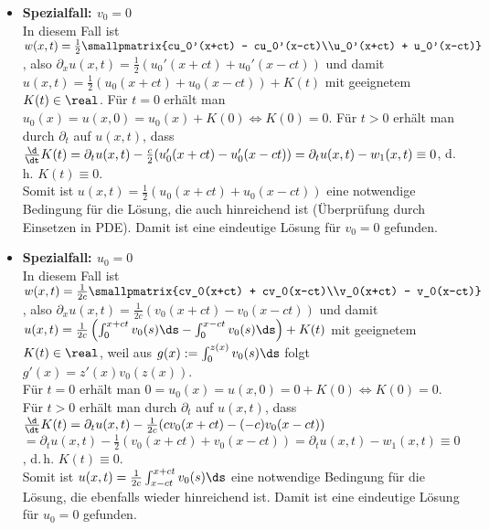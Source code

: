 \linie

\begin{Bem}
    \begin{itemize}
        \item
        \textbf{Spezialfall: $v_0 = 0$}\\
        In diesem Fall ist
        $w(x, t) = \frac{1}{2} \smallpmatrix{cu_0'(x+ct) - cu_0'(x-ct)\\u_0'(x+ct) + u_0'(x-ct)}$,
        also $\partial_x u(x, t) = \frac{1}{2} (u_0'(x+ct) + u_0'(x-ct))$ und damit
        $u(x, t) = \frac{1}{2} (u_0(x+ct) + u_0(x-ct)) + K(t)$ mit geeignetem $K(t) \in \real$.
        Für $t = 0$ erhält man $u_0(x) = u(x, 0) = u_0(x) + K(0) \iff K(0) = 0$.
        Für $t > 0$ erhält man durch $\partial_t$ auf $u(x, t)$, dass
        $\frac{\d}{\dt} K(t) = \partial_t u(x, t) - \frac{c}{2} (u_0'(x+ct) - u_0'(x-ct))
        = \partial_t u(x, t) - w_1(x, t) \equiv 0$,
        d.\,h. $K(t) \equiv 0$.\\
        Somit ist $u(x, t) = \frac{1}{2} (u_0(x+ct) + u_0(x-ct))$ eine notwendige Bedingung
        für die Lösung, die auch hinreichend ist (Überprüfung durch Einsetzen in PDE).
        Damit ist eine eindeutige Lösung für $v_0 = 0$ gefunden.

        \item
        \textbf{Spezialfall: $u_0 = 0$}\\
        In diesem Fall ist
        $w(x, t) = \frac{1}{2c} \smallpmatrix{cv_0(x+ct) + cv_0(x-ct)\\v_0(x+ct) - v_0(x-ct)}$,
        also $\partial_x u(x, t) = \frac{1}{2c} (v_0(x+ct) - v_0(x-ct))$ und damit
        $u(x, t) = \frac{1}{2c} \left(\int_0^{x+ct} v_0(s) \ds - \int_0^{x-ct} v_0(s) \ds\right)
        + K(t)$ mit geeignetem $K(t) \in \real$,
        weil aus $g(x) := \int_0^{z(x)} v_0(s) \ds$ folgt $g'(x) = z'(x) v_0(z(x))$.\\
        Für $t = 0$ erhält man $0 = u_0(x) = u(x, 0) = 0 + K(0) \iff K(0) = 0$.
        Für $t > 0$ erhält man durch $\partial_t$ auf $u(x, t)$, dass
        $\frac{\d}{\dt} K(t) = \partial_t u(x, t) - \frac{1}{2c} (c v_0(x+ct) - (-c) v_0(x-ct))$\\
        $= \partial_t u(x, t) - \frac{1}{2} (v_0(x+ct) + v_0(x-ct))
        = \partial_t u(x, t) - w_1(x, t) \equiv 0$,
        d.\,h. $K(t) \equiv 0$.\\
        Somit ist $u(x, t) = \frac{1}{2c} \int_{x-ct}^{x+ct} v_0(s) \ds$ eine notwendige Bedingung
        für die Lösung, die ebenfalls wieder hinreichend ist.
        Damit ist eine eindeutige Lösung für $u_0 = 0$ gefunden.
    \end{itemize}
\end{Bem}

